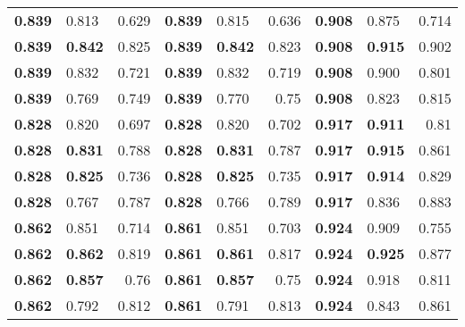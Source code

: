 \begin{tabular}{llrllrllr}
\toprule
 \bfseries 0.839 & 0.813       & 0.629 & \bfseries 0.839 & 0.815       & 0.636 & \bfseries 0.908 & 0.875       & 0.714 \\
 \bfseries 0.839 & \bfseries 0.842 & 0.825 & \bfseries 0.839 & \bfseries 0.842 & 0.823 & \bfseries 0.908 & \bfseries 0.915 & 0.902 \\
 \bfseries 0.839 & 0.832       & 0.721 & \bfseries 0.839 & 0.832       & 0.719 & \bfseries 0.908 & 0.900       & 0.801 \\
 \bfseries 0.839 & 0.769       & 0.749 & \bfseries 0.839 & 0.770       & 0.75  & \bfseries 0.908 & 0.823       & 0.815 \\
 \bfseries 0.828 & 0.820       & 0.697 & \bfseries 0.828 & 0.820       & 0.702 & \bfseries 0.917 & \bfseries 0.911 & 0.81  \\
 \bfseries 0.828 & \bfseries 0.831 & 0.788 & \bfseries 0.828 & \bfseries 0.831 & 0.787 & \bfseries 0.917 & \bfseries 0.915 & 0.861 \\
 \bfseries 0.828 & \bfseries 0.825 & 0.736 & \bfseries 0.828 & \bfseries 0.825 & 0.735 & \bfseries 0.917 & \bfseries 0.914 & 0.829 \\
 \bfseries 0.828 & 0.767       & 0.787 & \bfseries 0.828 & 0.766       & 0.789 & \bfseries 0.917 & 0.836       & 0.883 \\
 \bfseries 0.862 & 0.851       & 0.714 & \bfseries 0.861 & 0.851       & 0.703 & \bfseries 0.924 & 0.909       & 0.755 \\
 \bfseries 0.862 & \bfseries 0.862 & 0.819 & \bfseries 0.861 & \bfseries 0.861 & 0.817 & \bfseries 0.924 & \bfseries 0.925 & 0.877 \\
 \bfseries 0.862 & \bfseries 0.857 & 0.76  & \bfseries 0.861 & \bfseries 0.857 & 0.75  & \bfseries 0.924 & 0.918       & 0.811 \\
 \bfseries 0.862 & 0.792       & 0.812 & \bfseries 0.861 & 0.791       & 0.813 & \bfseries 0.924 & 0.843       & 0.861 \\
\bottomrule
\end{tabular}